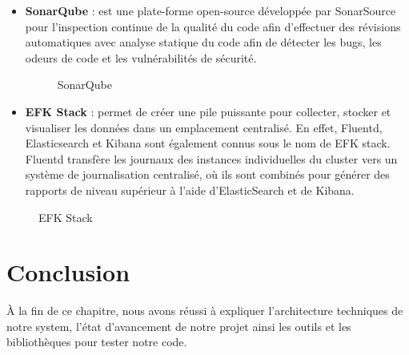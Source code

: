 \begin{itemize}
\item \textbf{SonarQube} : est une plate-forme open-source d\'evelopp\'ee par SonarSource pour l'inspection continue de la qualit\'e du code afin d'effectuer des r\'evisions automatiques avec analyse statique du code afin de d\'etecter les bugs, les odeurs de code et les vuln\'erabilit\'es de s\'ecurit\'e.
\begin{figure}[H]
	\caption{\label{fig:my-label} SonarQube}
\end{figure}
\item \textbf{EFK Stack} : permet de cr\'eer une pile puissante pour collecter, stocker et visualiser les donn\'ees dans un emplacement centralis\'e. En effet, Fluentd, Elasticsearch et Kibana sont \'egalement connus sous le nom de EFK stack. Fluentd transf\`ere les journaux des instances individuelles du cluster vers un syst\`eme de journalisation centralis\'e, o\`u ils sont combin\'es pour g\'en\'erer des rapports de niveau sup\'erieur \`a l'aide d'ElasticSearch et de Kibana.
\end{itemize}

\begin{figure}[H]
	\caption{\label{fig:my-label} EFK Stack}
\end{figure}

\section{Conclusion}

\`A la fin de ce chapitre, nous avons r\'eussi \`a expliquer l'architecture techniques de notre system, l'\'etat d'avancement de notre projet ainsi les outils et les biblioth\`eques pour tester notre code.



